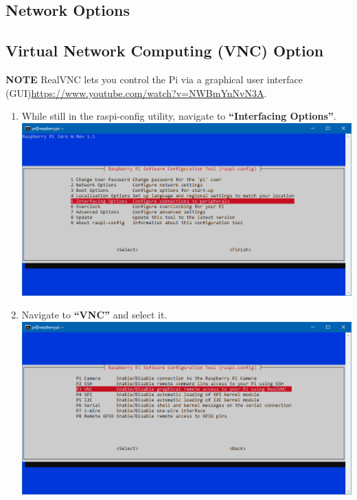 \documentclass{article}
\begin{document}
\subsection{Network Options}



\subsection{Virtual Network Computing (VNC) Option}

\textbf{NOTE} RealVNC lets you control the Pi via a graphical user interface (GUI)\url{https://www.youtube.com/watch?v=NWBmYnNvN3A}.

\begin{enumerate}
  \item While still in the raspi-config utility, navigate to \textbf{``Interfacing Options''}.
  \newline
  \newline
  \includegraphics[width=1.00\textwidth]{rcifoptions}
  \item Navigate to \textbf{``VNC''} and select it.
  \newline
  \newline
  \includegraphics[width=1.00\textwidth]{rcvnc}

\end{enumerate}
\end{document}
